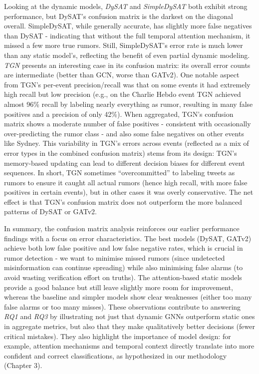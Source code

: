 \documentclass{cshonours}
\begin{document}
Looking at the dynamic models, \emph{DySAT} and \emph{SimpleDySAT} both exhibit strong performance, but DySAT's confusion matrix is the darkest on the diagonal overall. SimpleDySAT, while generally accurate, has slightly more false negatives than DySAT - indicating that without the full temporal attention mechanism, it missed a few more true rumors. Still, SimpleDySAT's error rate is much lower than any static model's, reflecting the benefit of even partial dynamic modeling. \emph{TGN} presents an interesting case in its confusion matrix: its overall error counts are intermediate (better than GCN, worse than GATv2). One notable aspect from TGN's per-event precision/recall was that on some events it had extremely high recall but low precision (e.g., on the Charlie Hebdo event TGN achieved almost 96\% recall by labeling nearly everything as rumor, resulting in many false positives and a precision of only 42\%). When aggregated, TGN's confusion matrix shows a moderate number of false positives - consistent with occasionally over-predicting the rumor class - and also some false negatives on other events like Sydney. This variability in TGN's errors across events (reflected as a mix of error types in the combined confusion matrix) stems from its design: TGN's memory-based updating can lead to different decision biases for different event sequences. In short, TGN sometimes ``overcommitted'' to labeling tweets as rumors to ensure it caught all actual rumors (hence high recall, with more false positives in certain events), but in other cases it was overly conservative. The net effect is that TGN's confusion matrix does not outperform the more balanced patterns of DySAT or GATv2.



In summary, the confusion matrix analysis reinforces our earlier performance findings with a focus on error characteristics. The best models (DySAT, GATv2) achieve both low false positive and low false negative rates, which is crucial in rumor detection - we want to minimise missed rumors (since undetected misinformation can continue spreading) while also minimising false alarms (to avoid wasting verification effort on truths). The attention-based static models provide a good balance but still leave slightly more room for improvement, whereas the baseline and simpler models show clear weaknesses (either too many false alarms or too many misses). These observations contribute to answering \emph{RQ1} and \emph{RQ3} by illustrating not just that dynamic GNNs outperform static ones in aggregate metrics, but also that they make qualitatively better decisions (fewer critical mistakes). They also highlight the importance of model design: for example, attention mechanisms and temporal context directly translate into more confident and correct classifications, as hypothesized in our methodology (Chapter 3).
\end{document}
